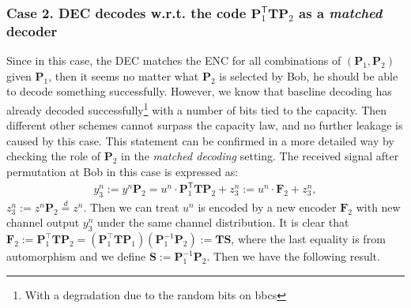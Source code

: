 \documentclass[onecolumn]{IEEEtran} %
\newcommand{\bP}{\mathbf P}
\newcommand{\bF}{\mathbf F}
\newcommand{\bS}{\mathbf S}
\newcommand{\1}{\mathbbm{1}}
\DeclareMathOperator{\Aut}{Aut}
\theoremstyle{boldremark}
\newtheorem{corollary}{Corollary}
\newcommand{\bT}{\mathbf{T}}
\begin{document}




    
\subsubsection{Case 2.  DEC decodes w.r.t. the code $\bP_1^{\mathsf T}\bT\bP_2$ as a \textit{matched} decoder} Since in this case, the DEC matches the ENC for all combinations of $(\bP_1,\bP_2)$ given $\bP_1$, then it seems no matter what $\bP_2$ is selected by Bob, he should be able to decode something successfully. However, we know that baseline decoding has already decoded successfully\footnote{With a degradation due to the random bits on \gls{bbcs}} with a number of bits tied to the capacity. Then different other schemes cannot surpass the capacity law, and no further leakage is caused by this case. This statement can be confirmed in a more detailed way by checking the role of $\bP_2$ in the \textit{matched decoding} setting. The received signal after permutation at Bob in this case is expressed as:
\begin{align}
y_3^n:=y^n\bP_2=u^n\cdot\bP_1^{\mathsf T}\bT\bP_2+z_3^n:=u^n\cdot\bF_2+z_3^n,     
\end{align}
$z_3^n:=z^n\bP_2\overset{d}=z^n$. Then we can treat $u^n$ is encoded by a new encoder $\bF_2$ with new channel output $y_3^n$ under the same channel distribution. It is clear that $\bF_2:=\bP_1^{\!\top}\bT\bP_2=(\bP_1^{\!\top}\bT\bP_1)(\bP_1^{-1}\bP_2):=\bT\bS$, where the last equality is from automorphism and we define $\bS:=\bP_1^{-1}\bP_2$. Then we have the following result.
\end{document}
